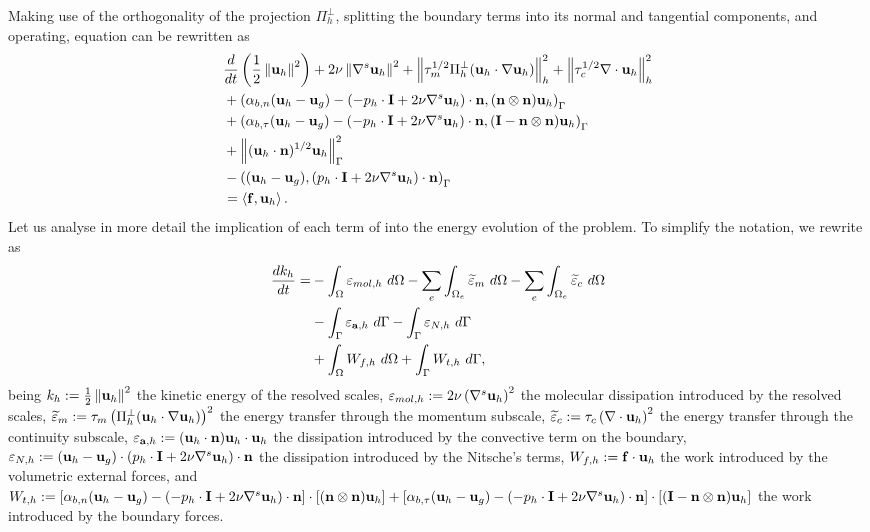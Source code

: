 Making use of the orthogonality of the projection $ \Pi_h^\perp $, splitting the boundary terms into its normal and tangential components, and operating, equation  can be rewritten as
\begin{align}
\label{eq-C7_NS_ene_balance_2}
&\frac{d}{dt}\left(\frac{1}{2}\left\|{\bf u}_h\right\|^2\right)+2\nu\left\|\nabla^s{\bf u}_h\right\|^2+\left\|\tau_m^{1/2}\Pi_h^\perp({\bf u}_h\cdot\nabla{\bf u}_h)\right\|^2_h+\left\|\tau_c^{1/2}\nabla\cdot{\bf u}_h\right\|^2_h\\\nonumber
&+\left(\alpha_{b,n}({\bf u}_h-{\bf u}_g)-(-p_h\cdot\mathbf{I}+2\nu\nabla^s{\bf u}_h)\cdot{\bf n},({\bf n}\otimes{\bf n}){\bf u}_h\right)_\Gamma\\\nonumber
&+\left(\alpha_{b,\tau}({\bf u}_h-{\bf u}_g)-(-p_h\cdot\mathbf{I}+2\nu\nabla^s{\bf u}_h)\cdot{\bf n},(\mathbf{I}-{\bf n}\otimes{\bf n}){\bf u}_h\right)_\Gamma\\\nonumber
&+\left\|({\bf u}_h\cdot{\bf n})^{1/2}{\bf u}_h\right\|^2_\Gamma\\\nonumber
&-\left(({\bf u}_h-{\bf u}_g),(p_h\cdot\mathbf{I}+2\nu\nabla^s{\bf u}_h)\cdot{\bf n}\right)_\Gamma\\\nonumber
&=\left\langle{\bf f},{\bf u}_h\right\rangle.
\end{align}
Let us analyse in more detail the implication of each term of  into the energy evolution of the problem. To simplify the notation, we rewrite  as
\begin{align}
\label{eq-C7_NS_ene_balance_3}
\frac{dk_h}{dt}=&-\int_{\Omega}\varepsilon_{mol,h}\ d\Omega-\sum_e\int_{\Omega_e}\widetilde{\varepsilon}_m\ d\Omega-\sum_e\int_{\Omega_e}\widetilde{\varepsilon}_c\ d\Omega\\\nonumber
&-\int_{\Gamma}\varepsilon_{\a,h}\ d\Gamma-\int_{\Gamma}\varepsilon_{N,h}\ d\Gamma\\\nonumber
&+\int_{\Omega}W_{f,h}\ d\Omega+\int_{\Gamma}W_{t,h}\ d\Gamma,
\end{align}
being $ k_h:=\frac{1}{2}\left\|{\bf u}_h\right\|^2 $ the kinetic energy of the resolved scales, $ \varepsilon_{mol,h}:=2\nu\left(\nabla^s{\bf u}_h\right)^2 $ the molecular dissipation introduced by the resolved scales, $ \widetilde{\varepsilon}_m:=\tau_m\left(\Pi_h^\perp({\bf u}_h\cdot\nabla{\bf u}_h)\right)^2 $ the energy transfer through the momentum subscale, $ \widetilde{\varepsilon}_c:=\tau_c\left(\nabla\cdot{\bf u}_h\right)^2 $ the energy transfer through the continuity subscale, $ \varepsilon_{{\bf a},h}:=({\bf u}_h\cdot{\bf n}){\bf u}_h\cdot{\bf u}_h $ the dissipation introduced by the convective term on the boundary, $ \varepsilon_{N,h}:=({\bf u}_h-{\bf u}_g)\cdot(p_h\cdot\mathbf{I}+2\nu\nabla^s{\bf u}_h)\cdot{\bf n} $ the dissipation introduced by the Nitsche's terms, $ W_{f,h}:={\bf f}\cdot{\bf u}_h $ the work introduced by the volumetric external forces, and $ W_{t,h}:=\left[\alpha_{b,n}({\bf u}_h-{\bf u}_g)-(-p_h\cdot\mathbf{I}+2\nu\nabla^s{\bf u}_h)\cdot{\bf n}\right]\cdot\left[({\bf n}\otimes{\bf n}){\bf u}_h\right]+\left[\alpha_{b,\tau}({\bf u}_h-{\bf u}_g)-(-p_h\cdot\mathbf{I}+2\nu\nabla^s{\bf u}_h)\cdot{\bf n}\right]\cdot\left[(\mathbf{I}-{\bf n}\otimes{\bf n}){\bf u}_h\right] $ the work introduced by the boundary forces.

